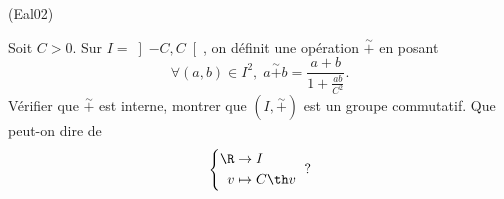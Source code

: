 \begin{tiny}(Eal02)\end{tiny} Soit $C>0$. Sur $I = \left] -C,C \right[ $, on définit une opération $\overset{\sim}{+}$ en
posant
\begin{displaymath}
\forall (a,b)\in I^{2},\; a \overset{\sim}{+} b = \frac{a+b}{1 + \frac{ab}{C^2}}.  
\end{displaymath}
Vérifier que $\overset{\sim}{+}$ est interne, montrer que $(I,\overset{\sim}{+})$ est un groupe commutatif. Que peut-on dire de
\begin{displaymath}
  \left\lbrace 
  \begin{aligned}
    \R &\rightarrow I \\ v &\mapsto C\th v
  \end{aligned}
  \right. \text{ ?}
\end{displaymath}
